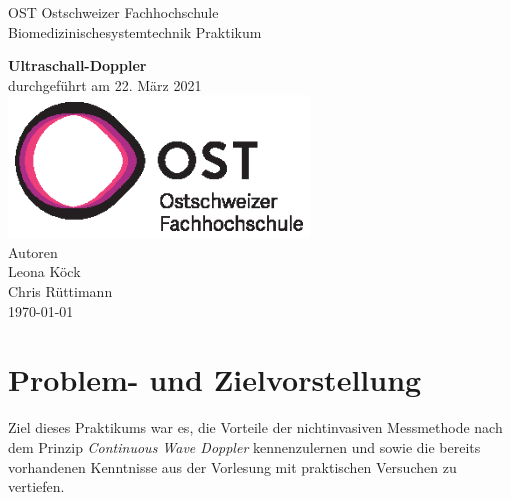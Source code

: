 \documentclass[11pt]{scrartcl}
\begin{document}
    \begin{titlepage}
        \begin{center}
        {\LARGE OST Ostschweizer Fachhochschule}
            \\[1.5cm]
            \linespread{1.2}\large { Biomedizinischesystemtechnik Praktikum }

            \huge{\bfseries Ultraschall-Doppler}
            \\%
            \large{durchgef{\"u}hrt am 22. März 2021}
            \\[1.5cm]
           \includegraphics[width=8cm]{../images/ost_logo.eps}
           \\[1cm]
            {\small{Autoren}}\\
            {\Large{Leona K{\"o}ck}}\\
            {\Large{Chris R{\"u}ttimann}}
            \\[1cm]

            \vspace*{\fill}
            \large{\today}
        \end{center}

    \end{titlepage}

    \addtocounter{section}{0}

    \tableofcontents
    \pagebreak



    \section{Problem- und Zielvorstellung}
    Ziel dieses Praktikums war es, die Vorteile der nichtinvasiven Messmethode nach dem Prinzip \emph{Continuous Wave Doppler}
    kennenzulernen und sowie die bereits vorhandenen Kenntnisse aus der Vorlesung mit praktischen Versuchen zu vertiefen. 
\end{document}
